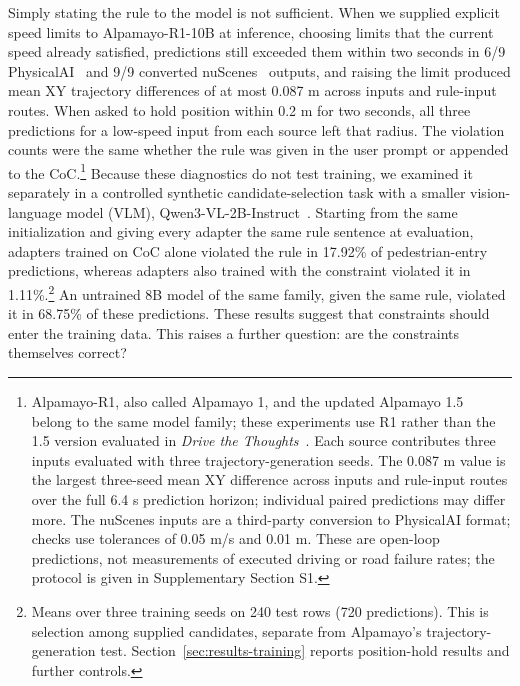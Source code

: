 Simply stating the rule to the model is not sufficient. When we supplied explicit speed limits to Alpamayo-R1-10B at inference, choosing limits that the current speed already satisfied, predictions still exceeded them within two seconds in 6/9 PhysicalAI~\cite{nvidia2025physicalai} and 9/9 converted nuScenes~\cite{caesar2020nuscenes} outputs, and raising the limit produced mean XY trajectory differences of at most 0.087 m across inputs and rule-input routes. When asked to hold position within 0.2 m for two seconds, all three predictions for a low-speed input from each source left that radius. The violation counts were the same whether the rule was given in the user prompt or appended to the CoC.\footnote{Alpamayo-R1, also called Alpamayo 1, and the updated Alpamayo 1.5~\cite{r20} belong to the same model family; these experiments use R1 rather than the 1.5 version evaluated in \emph{Drive the Thoughts}~\cite{r18}. Each source contributes three inputs evaluated with three trajectory-generation seeds. The 0.087 m value is the largest three-seed mean XY difference across inputs and rule-input routes over the full 6.4 s prediction horizon; individual paired predictions may differ more. The nuScenes inputs are a third-party conversion to PhysicalAI format; checks use tolerances of 0.05 m/s and 0.01 m. These are open-loop predictions, not measurements of executed driving or road failure rates; the protocol is given in Supplementary Section S1.} Because these diagnostics do not test training, we examined it separately in a controlled synthetic candidate-selection task with a smaller vision-language model (VLM), Qwen3-VL-2B-Instruct~\cite{qwen2025qwen3vl2b}. Starting from the same initialization and giving every adapter the same rule sentence at evaluation, adapters trained on CoC alone violated the rule in 17.92\% of pedestrian-entry predictions, whereas adapters also trained with the constraint violated it in 1.11\%.\footnote{Means over three training seeds on 240 test rows (720 predictions). This is selection among supplied candidates, separate from Alpamayo's trajectory-generation test. Section~\ref{sec:results-training} reports position-hold results and further controls.} An untrained 8B model of the same family, given the same rule, violated it in 68.75\% of these predictions. These results suggest that constraints should enter the training data. This raises a further question: are the constraints themselves correct?\par

